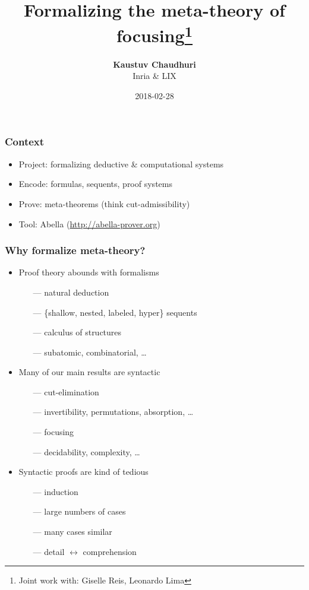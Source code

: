 \documentclass{beamer}
\begin{document}
\title{Formalizing the meta-theory of focusing\thanks{Joint work with:
    Giselle Reis, Leonardo Lima}}

\author{
  {\larger\textbf{Kaustuv Chaudhuri}}
  \\
  Inria \& LIX
}
\date{
  2018-02-28
}

\begin{frame}
  \maketitle
\end{frame}

\begin{frame}
  \frametitle{Context}

  \begin{itemize}
    \itemsep 1em
  \item Project: formalizing deductive \& computational systems
  \item Encode: formulas, sequents, proof systems
  \item Prove: meta-theorems (think cut-admissibility)
  \item Tool: Abella (\url{http://abella-prover.org})
  \end{itemize}
\end{frame}

\begin{frame}
  \frametitle{Why formalize meta-theory?}

  \begin{itemize}[<+->]\itemsep 1em
  \item Proof theory abounds with formalisms
    \begin{itemize}[<.->]
    \item[---] natural deduction
    \item[---] \{shallow, nested, labeled, hyper\} sequents
    \item[---] calculus of structures
    \item[---] subatomic, combinatorial, \dots
    \end{itemize}
  \item Many of our main results are syntactic
    \begin{itemize}[<.->]
    \item[---] cut-elimination
    \item[---] invertibility, permutations, absorption, \dots
    \item[---] focusing
    \item[---] decidability, complexity, \dots
    \end{itemize}
  \item Syntactic proofs are kind of tedious
    \begin{itemize}[<.->]
    \item[---] induction
    \item[---] large numbers of cases
    \item[---] many cases similar
    \item[---] detail $\longleftrightarrow$ comprehension
    \end{itemize}
  \end{itemize}
\end{frame}
\end{document}
